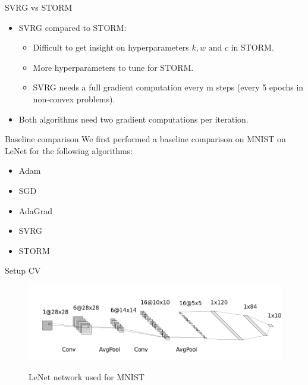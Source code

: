 \documentclass[10pt]{beamer}
\newcommand\pro{\item[\textbf{+}]}
\newcommand\con{\item[\textbf{--\kern 1.2pt}]}
\begin{document}
\begin{frame}{SVRG vs STORM}
    \begin{itemize}
        \item SVRG compared to STORM:
            \begin{itemize}
                \pro Difficult to get insight on hyperparameters $k,w \text{ and } c$ in STORM.
                \pro More hyperparameters to tune for STORM.
                \con SVRG needs a full gradient computation every m steps (every 5 epochs in non-convex problems).
            \end{itemize}
        \item Both algorithms need two gradient computations per iteration.
    \end{itemize}
\end{frame}

\begin{frame}{Baseline comparison}
    We first performed a baseline comparison on MNIST on LeNet for the following algorithms:
    \begin{itemize}
        \item Adam
        \item SGD
        \item AdaGrad
        \item SVRG
        \item STORM
    \end{itemize}
\end{frame}

\begin{frame}{Setup CV}
    \begin{figure}
        \centering
    \includegraphics[scale=0.4]{midterm presentation/images/LeNet.png}
        \label{fig:lenet}
        \caption{LeNet network used for MNIST}
    \end{figure} 
\end{frame}
\end{document}
